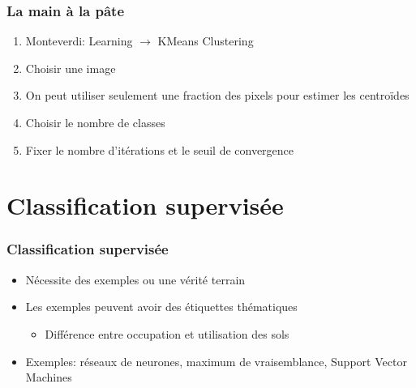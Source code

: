 \documentclass[compress]{beamer}
\begin{document}
\begin{frame}
  \frametitle{La main à la pâte}
  \begin{enumerate}
  \item Monteverdi: Learning $\rightarrow$ KMeans Clustering
  \item Choisir une image
  \item On peut utiliser seulement une fraction des pixels pour
    estimer les centroïdes
  \item Choisir le nombre de classes
  \item Fixer le nombre d'itérations et le seuil de convergence
  \end{enumerate}    
\end{frame}
\section[Supervisé]{Classification supervisée}
\label{sec:supervised}
\begin{frame}
  \frametitle{Classification supervisée}
  \begin{itemize}
  \item Nécessite des exemples ou une vérité terrain
  \item Les exemples peuvent avoir des étiquettes thématiques
    \begin{itemize}
    \item Différence entre occupation et utilisation des sols
    \end{itemize}
  \item Exemples: réseaux de neurones, maximum de vraisemblance, Support Vector Machines
  \end{itemize}
\end{frame}
\end{document}

